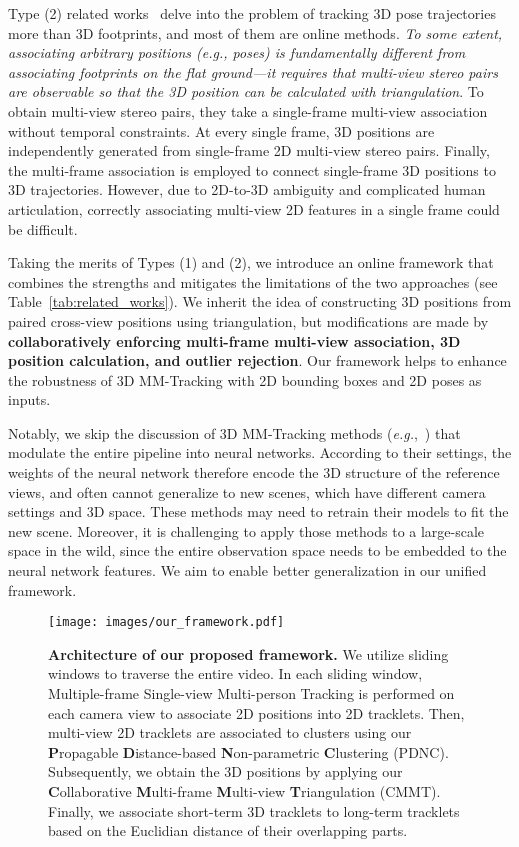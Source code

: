 \documentclass{CVM}
\newcommand{\eg}{{\it e.g.}}
\begin{document}
  Type (2) related works~\cite{chen2020multi,chen2020cross,ohashi20vmocap,dong2021fast} delve into the problem of tracking 3D pose trajectories more than 3D footprints, and most of them are online methods. \textit{To some extent, associating arbitrary positions (\eg, poses) is fundamentally different from associating footprints on the flat ground---it requires that multi-view stereo pairs are observable so that the 3D position can be calculated with triangulation}. To obtain multi-view stereo pairs, they take a single-frame multi-view association without temporal constraints. At every single frame, 3D positions are independently generated from single-frame 2D multi-view stereo pairs. Finally, the multi-frame association is employed to connect single-frame 3D positions to 3D trajectories. However, due to 2D-to-3D ambiguity and complicated human articulation, correctly associating multi-view 2D features in a single frame could be difficult.
  
  Taking the merits of Types (1) and (2), we introduce an online framework that combines the strengths and mitigates the limitations of the two approaches (see Table~\ref{tab:related_works}).  We inherit the idea of constructing 3D positions from paired cross-view positions using triangulation, but modifications are made by \textbf{collaboratively enforcing multi-frame multi-view association, 3D position calculation, and outlier rejection}. Our framework helps to enhance the robustness of 3D MM-Tracking with 2D bounding boxes and 2D poses as inputs.

 
 Notably, we skip the discussion of 3D MM-Tracking methods (\eg,~\cite{zhang2022voxeltrack}) that modulate the entire pipeline into neural networks. According to their settings, the weights of the neural network therefore encode the 3D structure of the reference views, and often cannot generalize to new scenes, which have different camera settings and 3D space. These methods may need to retrain their models to fit the new scene. Moreover, it is challenging to apply those methods to a large-scale space in the wild, since the entire observation space needs to be embedded to the neural network features. We aim to enable better generalization in our unified framework. 
  
 



\begin{figure*}[!h]
  \centering
  \texttt{[image: images/our\_framework.pdf]}
  \caption{\textbf{Architecture of our proposed framework.} We utilize sliding windows to traverse the entire video. In each sliding window, Multiple-frame Single-view Multi-person Tracking is performed on each camera view to associate 2D positions into 2D tracklets. Then, multi-view 2D tracklets are associated to clusters using our \textbf{P}ropagable \textbf{D}istance-based \textbf{N}on-parametric \textbf{C}lustering (PDNC). Subsequently, we obtain the 3D positions by applying our \textbf{C}ollaborative \textbf{M}ulti-frame \textbf{M}ulti-view \textbf{T}riangulation (CMMT). Finally, we associate short-term 3D tracklets to long-term tracklets based on the Euclidian distance of their overlapping parts.
  }\label{fig:our_framework}
\end{figure*}
\end{document}
